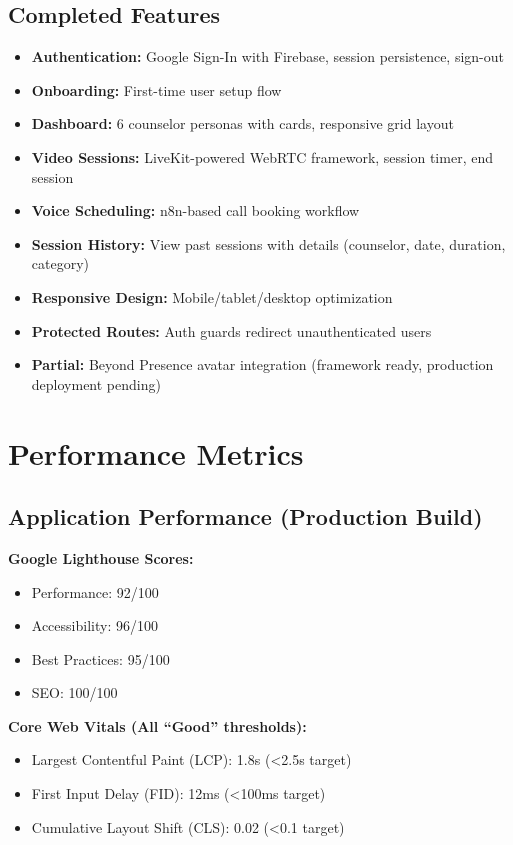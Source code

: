 \documentclass[11pt,a4paper]{report}
\begin{document}
\subsection{Completed Features}
\begin{itemize}
    \item[\checkmark] \textbf{Authentication:} Google Sign-In with Firebase, session persistence, sign-out
    \item[\checkmark] \textbf{Onboarding:} First-time user setup flow
    \item[\checkmark] \textbf{Dashboard:} 6 counselor personas with cards, responsive grid layout
    \item[\checkmark] \textbf{Video Sessions:} LiveKit-powered WebRTC framework, session timer, end session
    \item[\checkmark] \textbf{Voice Scheduling:} n8n-based call booking workflow
    \item[\checkmark] \textbf{Session History:} View past sessions with details (counselor, date, duration, category)
    \item[\checkmark] \textbf{Responsive Design:} Mobile/tablet/desktop optimization
    \item[\checkmark] \textbf{Protected Routes:} Auth guards redirect unauthenticated users
    \item[$\triangle$] \textbf{Partial:} Beyond Presence avatar integration (framework ready, production deployment pending)
\end{itemize}

\section{Performance Metrics}

\subsection{Application Performance (Production Build)}

\textbf{Google Lighthouse Scores:}
\begin{itemize}
    \item Performance: 92/100
    \item Accessibility: 96/100
    \item Best Practices: 95/100
    \item SEO: 100/100
\end{itemize}

\textbf{Core Web Vitals (All ``Good'' thresholds):}
\begin{itemize}
    \item Largest Contentful Paint (LCP): 1.8s (<2.5s target)
    \item First Input Delay (FID): 12ms (<100ms target)
    \item Cumulative Layout Shift (CLS): 0.02 (<0.1 target)
\end{itemize}
\end{document}
